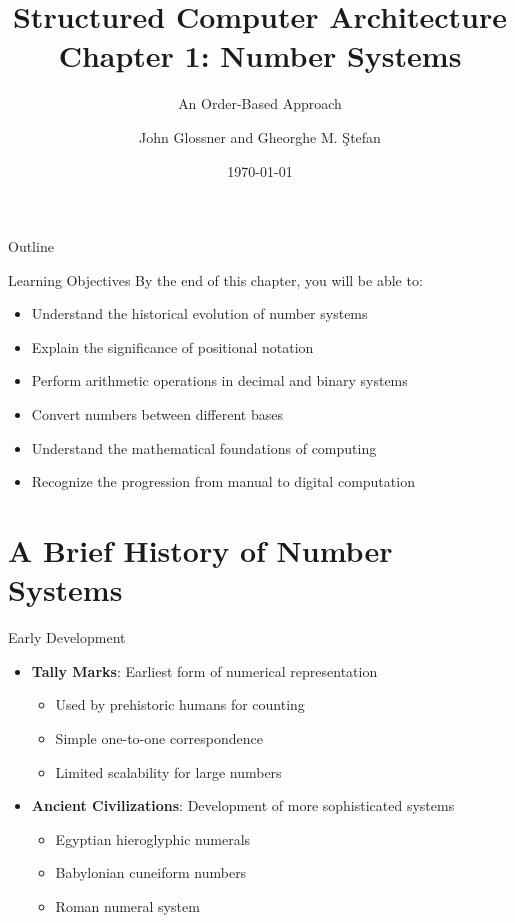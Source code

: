 \documentclass[aspectratio=169,11pt]{beamer}
\title[Chapter 1: Number Systems]{Structured Computer Architecture\\Chapter 1: Number Systems}
\subtitle{An Order-Based Approach}
\author{John Glossner and Gheorghe M. Ştefan}
\institute{Based on the textbook}
\date{\today}
\newcommand{\concept}[1]{\textbf{\color{accentcolor}#1}}
\begin{document}
\begin{frame}
\titlepage
\end{frame}

\begin{frame}{Outline}
\tableofcontents
\end{frame}

\begin{frame}{Learning Objectives}
By the end of this chapter, you will be able to:
\begin{itemize}
\item Understand the historical evolution of number systems
\item Explain the significance of positional notation
\item Perform arithmetic operations in decimal and binary systems
\item Convert numbers between different bases
\item Understand the mathematical foundations of computing
\item Recognize the progression from manual to digital computation
\end{itemize}
\end{frame}

\section{A Brief History of Number Systems}

\begin{frame}{Early Development}
\begin{itemize}
\item \concept{Tally Marks}: Earliest form of numerical representation
\begin{itemize}
\item Used by prehistoric humans for counting
\item Simple one-to-one correspondence
\item Limited scalability for large numbers
\end{itemize}
\vspace{0.5cm}
\item \concept{Ancient Civilizations}: Development of more sophisticated systems
\begin{itemize}
\item Egyptian hieroglyphic numerals
\item Babylonian cuneiform numbers
\item Roman numeral system
\end{itemize}
\end{itemize}
\end{frame}
\end{document}
